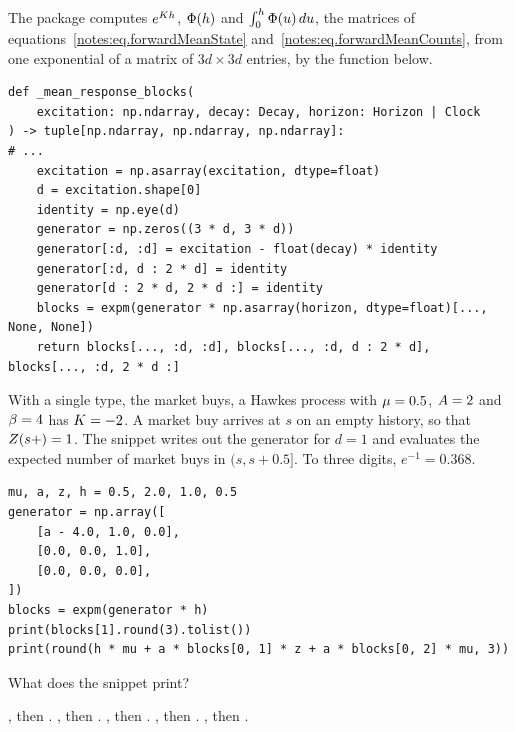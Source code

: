\begin{question}
\label{question.blockExponentialOfOneMarketBuy}
The package computes $e^{K h}$, $\Phi(h)$
and $\int_{0}^{h} \Phi(u) \, du$,
the matrices of equations~\eqref{notes:eq.forwardMeanState} and~\eqref{notes:eq.forwardMeanCounts},
from one exponential of a matrix of $3d \times 3d$ entries,
by the function below.
\begin{lstlisting}[caption={\protect\codehl{unito26.lob.hawkes.\_mean\_response\_blocks}, its docstring elided.}, label=listing.meanResponseBlocks]
def _mean_response_blocks(
    excitation: np.ndarray, decay: Decay, horizon: Horizon | Clock
) -> tuple[np.ndarray, np.ndarray, np.ndarray]:
# ...
    excitation = np.asarray(excitation, dtype=float)
    d = excitation.shape[0]
    identity = np.eye(d)
    generator = np.zeros((3 * d, 3 * d))
    generator[:d, :d] = excitation - float(decay) * identity
    generator[:d, d : 2 * d] = identity
    generator[d : 2 * d, 2 * d :] = identity
    blocks = expm(generator * np.asarray(horizon, dtype=float)[..., None, None])
    return blocks[..., :d, :d], blocks[..., :d, d : 2 * d], blocks[..., :d, 2 * d :]
\end{lstlisting}
With a single type, the market buys,
a Hawkes process with $\mu = 0.5$, $A = 2$ and $\beta = 4$
has $K = -2$.
A market buy arrives at $s$ on an empty history, so that $Z(s+) = 1$.
The snippet writes out the generator for $d = 1$
and evaluates the expected number of market buys in $(s, s + 0.5]$.
To three digits, $e^{-1} = 0.368$.
\begin{lstlisting}[caption={The blocks for one type}, label=listing.blockExponentialOfOneMarketBuy]
mu, a, z, h = 0.5, 2.0, 1.0, 0.5
generator = np.array([
    [a - 4.0, 1.0, 0.0],
    [0.0, 0.0, 1.0],
    [0.0, 0.0, 0.0],
])
blocks = expm(generator * h)
print(blocks[1].round(3).tolist())
print(round(h * mu + a * blocks[0, 1] * z + a * blocks[0, 2] * mu, 3))
\end{lstlisting}
What does the snippet print?
\begin{choices}
 \choice \codehl{[0.0, 0.0, 0.5]}, then .
 \choice \codehl{[0.0, 1.0, 0.5]}, then .
 \choice \codehl{[0.0, 1.0, 0.5]}, then .
 \correctchoice \codehl{[0.0, 1.0, 0.5]}, then .
 \choice \codehl{[0.0, 1.0, 0.5]}, then .
\end{choices}
\end{question}

